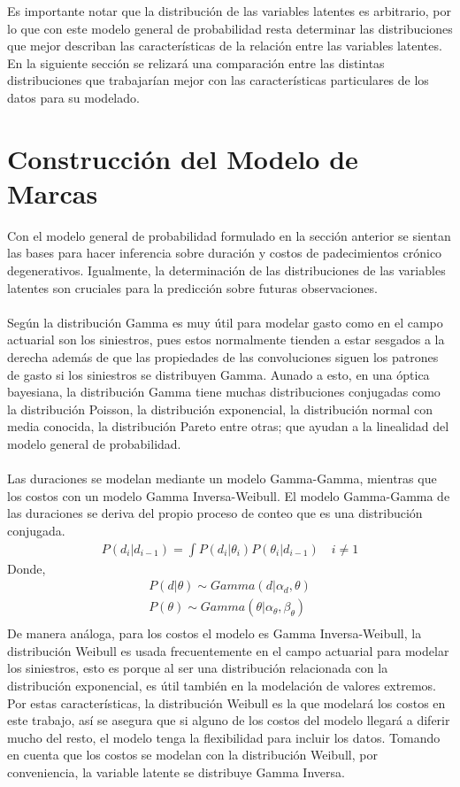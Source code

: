 Es importante notar que la distribuci\'on de las variables latentes es arbitrario, por lo que con este modelo general de probabilidad resta determinar las distribuciones que mejor describan las caracter\'isticas de la relaci\'on entre las variables latentes. En la siguiente secci\'on se relizar\'a una comparaci\'on entre las distintas distribuciones que trabajar\'ian mejor con las caracter\'isticas particulares de los datos para su modelado.\\

\section{Construcci\'on del Modelo de Marcas}
Con el modelo general de probabilidad formulado en la secci\'on anterior se sientan las bases para hacer inferencia sobre duraci\'on y costos de padecimientos cr\'onico degenerativos. Igualmente, la determinaci\'on de las distribuciones de las variables latentes son cruciales para la predicci\'on sobre futuras observaciones.\\
\\
Seg\'un \cite{fader2013gamma} la distribuci\'on Gamma es muy \'util para modelar gasto como en el campo actuarial son los siniestros, pues estos normalmente tienden a estar sesgados a la derecha adem\'as de que las propiedades de las convoluciones siguen los patrones de gasto si los siniestros se distribuyen Gamma. Aunado a esto, en una \'optica bayesiana, la distribuci\'on Gamma tiene muchas distribuciones conjugadas como la distribuci\'on Poisson, la distribuci\'on exponencial, la distribuci\'on normal con media conocida, la distribuci\'on Pareto entre otras; que ayudan a la linealidad del modelo general de probabilidad.\\
\\
Las duraciones se modelan mediante un modelo Gamma-Gamma, mientras que los costos con un modelo Gamma Inversa-Weibull. El modelo Gamma-Gamma de las duraciones se deriva del propio proceso de conteo que es una distribuci\'on conjugada.
\begin{align*}
P(d_i|d_{i-1})=\int P(d_i|\theta_i) P(\theta_i|d_{i-1}) \quad i \neq 1
\end{align*}
Donde,
\begin{align*}
P(d|\theta) \sim Gamma(d|\alpha_d,\theta)\\
P(\theta) \sim Gamma(\theta|\alpha_{\theta},\beta_\theta)\\
\end{align*}
De manera an\'aloga, para los costos el modelo es Gamma Inversa-Weibull, la distribuci\'on Weibull es usada frecuentemente en el campo actuarial para modelar los siniestros, esto es porque al ser una distribuci\'on relacionada con la distribuci\'on exponencial, es \'util tambi\'en en la modelaci\'on de valores extremos. Por estas caracter\'isticas, la distribuci\'on Weibull es la que modelar\'a los costos en este trabajo, as\'i se asegura que si alguno de los costos del modelo llegar\'a a diferir mucho del resto, el modelo tenga la flexibilidad para incluir los datos. Tomando en cuenta que los costos se modelan con la distribuci\'on Weibull, por conveniencia, la variable latente se distribuye Gamma Inversa.
